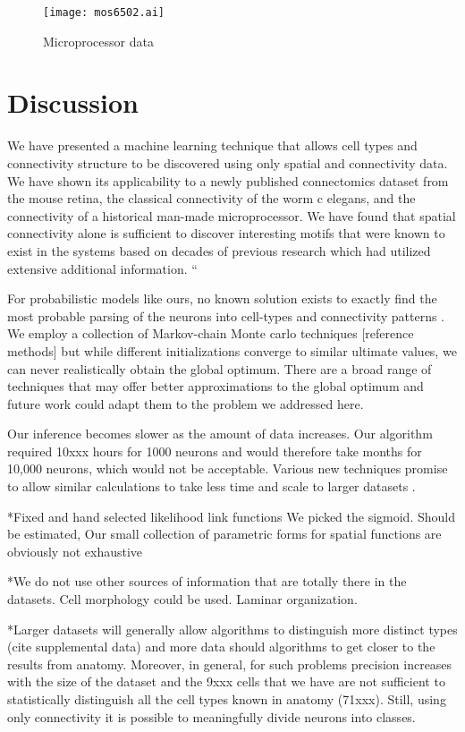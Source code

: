 \documentclass{article}
\begin{document}
\begin{figure}
  \centering 
  \centerline{\texttt{[image: mos6502.ai]}}
  \caption{Microprocessor data}
\end{figure}


\section{Discussion}
We have presented a machine learning technique that allows cell types
and connectivity structure to be discovered using only spatial and
connectivity data. We have shown its applicability to a newly
published connectomics dataset from the mouse retina, the classical
connectivity of the worm c elegans, and the connectivity of a
historical man-made microprocessor. We have found that spatial
connectivity alone is sufficient to discover interesting motifs that
were known to exist in the systems based on decades of previous
research which had utilized extensive additional information. “

For probabilistic models like ours, no known solution exists to
exactly find the most probable parsing of the neurons into cell-types
and connectivity patterns . We employ a collection of Markov-chain
Monte carlo techniques [reference methods] but while different
initializations converge to similar ultimate values, we can never
realistically obtain the global optimum. There are a broad range of
techniques that may offer better approximations to the global optimum
\autocite{Wanga2012,FritzJonathan} and future work could adapt them to
the problem we addressed here.

Our inference becomes slower as the amount of data increases. Our
algorithm required 10xxx hours for 1000 neurons and would therefore
take months for 10,000 neurons, which would not be acceptable. Various
new techniques promise to allow similar calculations to take less time
and scale to larger datasets \autocite{}.


*Fixed and hand selected likelihood link functions We picked the
sigmoid. Should be estimated, Our small collection of parametric forms
for spatial functions are obviously not exhaustive

*We do not use other sources of information that are totally there in
the datasets. Cell morphology could be used. Laminar organization.

*Larger datasets will generally allow algorithms to distinguish more
distinct types (cite supplemental data) and more data should
algorithms to get closer to the results from anatomy. Moreover, in
general, for such problems precision increases with the size of the
dataset and the 9xxx cells that we have are not sufficient to
statistically distinguish all the cell types known in anatomy
(71xxx). Still, using only connectivity it is possible to meaningfully
divide neurons into classes.
\end{document}
